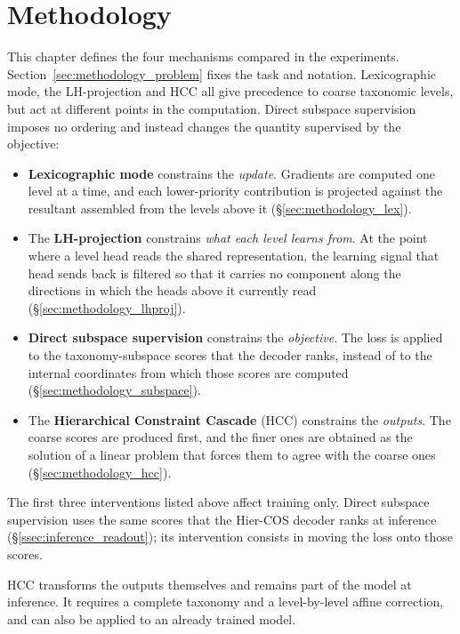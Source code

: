 \chapter{Methodology}
\label{ch:methods}

This chapter defines the four mechanisms compared in the experiments.
Section~\ref{sec:methodology_problem} fixes the task and notation. Lexicographic
mode, the LH-projection and HCC all give precedence to coarse taxonomic levels,
but act at different points in the computation. Direct subspace supervision
imposes no ordering and instead changes the quantity supervised by the
objective:

\begin{itemize}
    \item \textbf{Lexicographic mode} constrains the \emph{update}. Gradients are
    computed one level at a time, and each lower-priority contribution is
    projected against the resultant assembled from the levels above it
    (\S\ref{sec:methodology_lex}).
    \item The \textbf{LH-projection} constrains \emph{what each level learns
    from}. At the point where a level head reads the shared representation, the
    learning signal that head sends back is filtered so that it carries no
    component along the directions in which the heads above it currently read
    (\S\ref{sec:methodology_lhproj}).
    \item \textbf{Direct subspace supervision} constrains the \emph{objective}.
    The loss is applied to the taxonomy-subspace scores that the decoder ranks,
    instead of to the internal coordinates from which those scores are computed
    (\S\ref{sec:methodology_subspace}).
    \item The \textbf{Hierarchical Constraint Cascade} (HCC) constrains the
    \emph{outputs}. The coarse scores are produced first, and the finer ones are
    obtained as the solution of a linear problem that forces them to agree with
    the coarse ones (\S\ref{sec:methodology_hcc}).
\end{itemize}

The first three interventions listed above affect training only. Direct subspace
supervision uses the same scores that the Hier-COS decoder ranks at inference
(\S\ref{ssec:inference_readout}); its intervention consists in moving the loss
onto those scores.

HCC transforms the outputs themselves and remains part of the model at
inference. It requires a complete taxonomy and a level-by-level affine correction,
and can also be applied to an already trained model.

